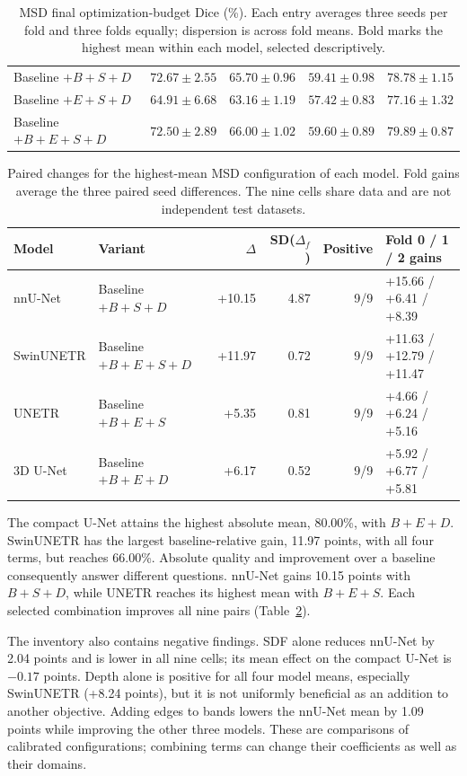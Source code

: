 \documentclass[12pt,a4paper]{article}
\begin{document}
\begin{table}[htbp]
\begin{tabular}{@{}lrrrr@{}}
Baseline $+B+S+D$ & $\mathbf{72.67\pm2.55}$ & $65.70\pm0.96$ & $59.41\pm0.98$ & $78.78\pm1.15$ \\
Baseline $+E+S+D$ & $64.91\pm6.68$ & $63.16\pm1.19$ & $57.42\pm0.83$ & $77.16\pm1.32$ \\
Baseline $+B+E+S+D$ & $72.50\pm2.89$ & $\mathbf{66.00\pm1.02}$ & $59.60\pm0.89$ & $79.89\pm0.87$ \\
\hline
\end{tabular}
\caption{MSD final optimization-budget Dice (\%). Each entry averages three seeds per fold and three folds equally; dispersion is across fold means. Bold marks the highest mean within each model, selected descriptively.}
\label{tab:msd-noaug-matrix}
\end{table}
\begin{table}[htbp]
\centering\footnotesize{}
\setlength{\tabcolsep}{5pt}
\renewcommand{\arraystretch}{1.15}
\begin{tabular}{@{}llrrrl@{}}
\hline
Model & Variant & $\Delta$ & SD($\Delta_f$) & Positive & Fold 0 / 1 / 2 gains \\
\hline
nnU-Net & Baseline $+B+S+D$ & +10.15 & 4.87 & 9/9 & +15.66 / +6.41 / +8.39 \\
SwinUNETR & Baseline $+B+E+S+D$ & +11.97 & 0.72 & 9/9 & +11.63 / +12.79 / +11.47 \\
UNETR & Baseline $+B+E+S$ & +5.35 & 0.81 & 9/9 & +4.66 / +6.24 / +5.16 \\
3D U-Net & Baseline $+B+E+D$ & +6.17 & 0.52 & 9/9 & +5.92 / +6.77 / +5.81 \\
\hline
\end{tabular}
\caption{Paired changes for the highest-mean MSD configuration of each model. Fold gains average the three paired seed differences. The nine cells share data and are not independent test datasets.}
\label{tab:msd-noaug-best}
\end{table}

The compact U-Net attains the highest absolute mean, 80.00\%, with
$B+E+D$. SwinUNETR has the largest baseline-relative gain, 11.97
points, with all four terms, but reaches 66.00\%. Absolute quality
and improvement over a baseline consequently answer different questions.
nnU-Net gains 10.15 points with $B+S+D$, while UNETR reaches its highest
mean with $B+E+S$. Each selected combination improves all nine pairs
(Table~\ref{tab:msd-noaug-best}).

The inventory also contains negative findings. SDF alone reduces
nnU-Net by 2.04 points and is lower in all nine cells; its mean effect
on the compact U-Net is $-0.17$ points. Depth alone is positive for
all four model means, especially SwinUNETR (+8.24 points), but it is
not uniformly beneficial as an addition to another objective. Adding
edges to bands lowers the nnU-Net mean by 1.09 points while improving
the other three models. These are comparisons of calibrated configurations;
combining terms can change their coefficients as well as their domains.
\end{document}
